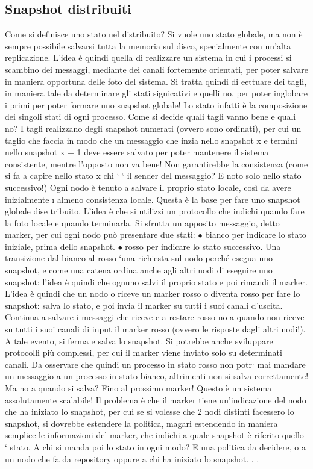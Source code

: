 \subsection{Snapshot distribuiti}
Come si definisce uno stato nel distribuito? Si vuole uno stato globale, ma
non è sempre possibile salvarsi tutta la memoria sul disco, specialmente con
un'alta replicazione. L'idea è quindi quella di realizzare un sistema in cui i
processi si scambino dei messaggi, mediante dei canali fortemente orientati, per
poter salvare in maniera opportuna delle foto del sistema. Si tratta quindi di
eettuare dei tagli, in maniera tale da determinare gli stati signicativi e quelli
no, per poter inglobare i primi per poter formare uno snapshot globale! Lo stato
infatti è la composizione dei singoli stati di ogni processo.
Come si decide quali tagli vanno bene e quali no? I tagli realizzano degli
snapshot numerati (ovvero sono ordinati), per cui un taglio che faccia in modo
che un messaggio che inzia nello snapshot x e termini nello snapshot x + 1 deve
essere salvato per poter mantenere il sistema consistente, mentre l'opposto non
va bene! Non garantirebbe la consistenza (come si fa a capire nello stato x chi
`
` il sender del messaggio? E noto solo nello stato successivo!)
Ogni nodo è tenuto a salvare il proprio stato locale, così da avere inizialmente
\i{}
almeno consistenza locale. Questa è la base per fare uno snapshot globale dise
tribuito. L'idea è che si utilizzi un protocollo che indichi quando fare la foto
locale e quando terminarla. Si sfrutta un apposito messaggio, detto marker, per
cui ogni nodo può presentare due stati:
$\bullet$ bianco per indicare lo stato iniziale, prima dello snapshot.
$\bullet$ rosso per indicare lo stato successivo.
Una transizione dal bianco al rosso `una richiesta sul nodo perché esegua uno
snapshot, e come una catena ordina anche agli altri nodi di eseguire uno snapshot: l'idea è quindi che ognuno salvi il
proprio stato e poi rimandi il marker.
L'idea è quindi che un nodo o riceve un marker rosso o diventa rosso per
fare lo snapshot: salva lo stato, e poi invia il marker su tutti i suoi canali
d'uscita. Continua a salvare i messaggi che riceve e a restare rosso no a quando
non riceve su tutti i suoi canali di input il marker rosso (ovvero le risposte
dagli altri nodi!). A tale evento, si ferma e salva lo snapshot. Si potrebbe
anche sviluppare protocolli più complessi, per cui il marker viene inviato solo
su determinati canali. Da osservare che quindi un processo in stato rosso non
potr` mai mandare un messaggio a un processo in stato bianco, altrimenti non
si salva correttamente!
Ma no a quando si salva? Fino al prossimo marker! Questo è un sistema
assolutamente scalabile! Il problema è che il marker tiene un'indicazione del
nodo che ha iniziato lo snapshot, per cui se si volesse che 2 nodi distinti facessero
lo snapshot, si dovrebbe estendere la politica, magari estendendo in maniera
semplice le informazioni del marker, che indichi a quale snapshot è riferito quello
`
stato. A chi si manda poi lo stato in ogni modo? E una politica da decidere, o
a un nodo che fa da repository oppure a chi ha iniziato lo snapshot. . .